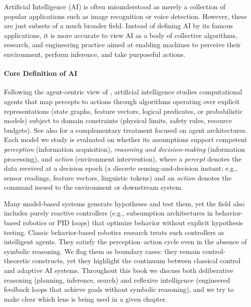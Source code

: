 Artificial Intelligence (AI) is often misunderstood as merely a collection of popular applications such as image recognition or voice detection. However, these are just subsets of a much broader field. Instead of defining AI by its famous applications, it is more accurate to view AI as a body of collective algorithms, research, and engineering practice aimed at enabling machines to perceive their environment, perform inference, and take purposeful actions.

\paragraph{Core Definition of AI}

Following the agent-centric view of \citet{RussellNorvig2021}, artificial intelligence studies
computational agents that map percepts to actions through algorithms operating over explicit
representations (state graphs, feature vectors, logical predicates, or probabilistic models)
subject to domain constraints (physical limits, safety rules, resource budgets). See also
\citet{PooleMackworth2017} for a complementary treatment focused on agent architectures.
Each model we study is evaluated on whether its assumptions support competent \emph{perception}
(information acquisition), \emph{reasoning and decision-making} (information processing), and
\emph{action} (environment intervention), where a \emph{percept} denotes the data received at a
decision epoch (a discrete sensing-and-decision instant; e.g., sensor readings, feature vectors, linguistic tokens) and an \emph{action} denotes the
command issued to the environment or downstream system.

Many model-based systems generate hypotheses and test them, yet the field also includes purely
reactive controllers (e.g., subsumption architectures in behavior-based robotics or PID loops)
that optimize behavior without explicit hypothesis testing.
Classic behavior-based robotics research \citep{Brooks1986,Arkin1998} treats such controllers as
intelligent agents. They satisfy the perception--action cycle even in the absence of symbolic
reasoning. We flag them as boundary cases: they remain control-theoretic constructs, yet they
highlight the continuum between classical control and adaptive AI systems. Throughout this book we discuss both deliberative reasoning (planning, inference, search) and
reflexive intelligence (engineered feedback loops that achieve goals without symbolic reasoning),
and we try to make clear which lens is being used in a given chapter.

